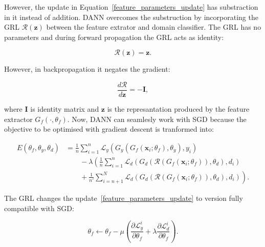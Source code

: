 However, the update in Equation~\ref{feature_parameters_update} has substraction in it instead of addition.
DANN overcomes the substruction by incorporating the GRL
\(\mathcal{R}(\mathbf{z})\) between the feature extrator and domain classifier.
The GRL has no parameters
and during forward propagation the GRL acts as identity:

\begin{equation}
	\mathcal{R}(\mathbf{z}) = \mathbf{z}.
\end{equation}

However, in backpropagation it negates the gradient:

\begin{equation}
	\frac{d \mathcal{R}}{d \mathbf{z}} = -\mathbf{I},
\end{equation}

where \(\mathbf{I}\) is identity matrix
and \(\mathbf{z}\) is the represantation produced by the feature extractor
\(G_f(\cdot, \theta_f)\).
Now, DANN can seamlesly work with SGD
because the objective to be optimised with gradient descent is tranformed into:

\begin{align}
	E(\theta_f, \theta_y, \theta_d) &= \frac{1}{n} \sum^{n}_{i = 1} \mathcal{L}_y(G_y(G_f(\mathbf{x}_i; \theta_f), \theta_y), y_i) \nonumber \\
	&\qquad {} - \lambda \left(\frac{1}{n} \sum^{n}_{i = 1} \mathcal{L}_d(G_d(\mathcal{R}(G_f(\mathbf{x}_i; \theta_f)), \theta_d), d_i) \right. \nonumber \\
	&\qquad \left. {} + \frac{1}{n'} \sum^{N}_{i = n + 1} \mathcal{L}_d(G_d(\mathcal{R}(G_f(\mathbf{x}_i; \theta_f)), \theta_d), d_i)\right).
	\label{dann_loss}
\end{align}

The GRL changes the update~\ref{feature_parameters_update}
to version fully compatible with SGD:

\begin{equation}
	\theta_f \gets \theta_f - \mu \left(
	\frac{\partial \mathcal{L}_y^i}{\partial \theta_f}
	+ \lambda \frac{\partial \mathcal{L}_d^i}{\partial \theta_f}
	\right).
\end{equation}

